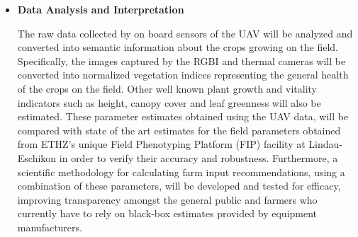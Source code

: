 \begin{itemize}
\item {\bf Data Analysis and Interpretation}

 The raw data collected by on board sensors of the UAV will be analyzed and converted into semantic information about the crops growing on the field. Specifically, the images captured by the RGBI and thermal cameras will be converted into normalized vegetation indices representing the general health of the crops on the field. Other well known plant growth and vitality indicators such as height, canopy cover and leaf greenness will also be estimated. These parameter estimates obtained using the UAV data, will be compared with state of the art estimates for the field parameters obtained from ETHZ's unique Field Phenotyping Platform (FIP) facility at Lindau-Eschikon in order to verify their accuracy and robustness. Furthermore, a scientific methodology for calculating farm input recommendations, using a combination of these parameters, will be developed and tested for efficacy, improving transparency amongst the general public and farmers who currently have to rely on black-box estimates provided by equipment manufacturers.
 
\end{itemize}

